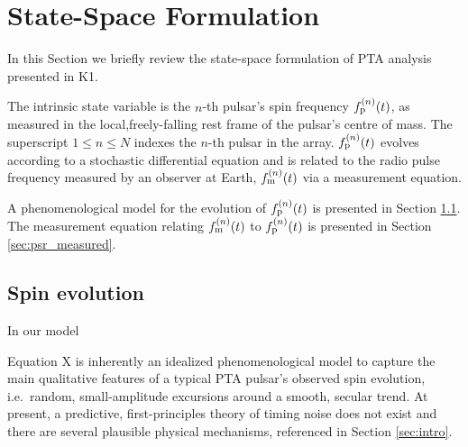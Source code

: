 \documentclass[fleqn,usenatbib,useAMS]{mnras}
\begin{document}
\section{State-Space Formulation}\label{sec:model}

In this Section we briefly review the state-space formulation of PTA analysis presented in K1.

The intrinsic state variable is the $n$-th pulsar's spin frequency $f_{\rm p}^{(n)}(t)$, as measured in the local,freely-falling rest frame of the pulsar's centre of mass. The superscript $1\leq n\leq N$ indexes the $n$-th pulsar in the array. $f_{\rm p}^{(n)}(t)$ evolves according to a stochastic differential equation and is related to the radio pulse frequency measured by an observer at Earth, $f_{\rm m}^{(n)}(t)$ via a measurement equation. 



A phenomenological model for the evolution of $f_{\rm p}^{(n)}(t)$ is presented in Section \ref{sec:psr_frequency}. The measurement equation relating $f_{\rm m}^{(n)}(t)$ to $f_{\rm p}^{(n)}(t)$ is presented in Section \ref{sec:psr_measured}. 




\subsection{Spin evolution} \label{sec:psr_frequency}



In our model













Equation X is inherently an idealized phenomenological model to capture the main qualitative features of a typical PTA pulsar's observed spin evolution, i.e.\ random, small-amplitude excursions around a smooth, secular trend. At present, a predictive, first-principles theory of timing noise does not exist and there are several plausible physical mechanisms, referenced in Section \ref{sec:intro}. 
\end{document}
